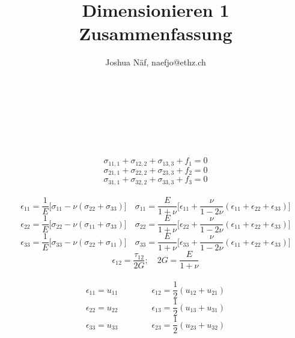 \documentclass[a4paper,10pt]{article}
\title{Dimensionieren 1 Zusammenfassung\vspace{-2ex}}
\author{Joshua Näf, naefjo@ethz.ch}
\date{}
\begin{document}
\newcommand{\mysec}[1]{\colorbox{mydblue}{\textcolor{white}{\parbox{\linewidth-2.4mm}{\scshape{\Large\textbf{#1}} }}}}
\newcommand{\mysubsec}[1]{\colorbox{mylblue}{\textcolor{white}{\\\scshape{\normalsize\textbf{#1}}}}\\}
\newcommand{\mysubsubsec}[1]{\colorbox{mygblue}{\textcolor{white}{\scshape{\footnotesize\textbf{#1}}}}\\}

\begin{multicols*}{3}

\mysec{Methoden d Strukturanalyse}
   \mysubsec{Gleichungen des kontinuums:}
        \mysubsubsec{GGWB des Kontinuums:}
            \[\sigma_{11,1} + \sigma_{12,2} + \sigma_{13,3} + f_1 = 0\]
            \[\sigma_{21,1} + \sigma_{22,2} + \sigma_{23,3} + f_2 = 0\]
            \[\sigma_{31,1} + \sigma_{32,2} + \sigma_{33,3} + f_3 = 0\]
        \mysubsubsec{Stoffgleichungen (SG):}
            \small\[\epsilon_{11} = \frac{1}{E}\lbrack\sigma_{11} - \nu(\sigma_{22} + \sigma_{33})\rbrack \quad \sigma_{11}=\frac{E}{1+\nu}\lbrack\epsilon_{11}+\frac{\nu}{1-2\nu}(\epsilon_{11}+\epsilon_{22}+\epsilon_{33})\rbrack\]
            \[\epsilon_{22} = \frac{1}{E}\lbrack\sigma_{22} - \nu(\sigma_{11} + \sigma_{33})\rbrack \quad \sigma_{22}=\frac{E}{1+\nu}\lbrack\epsilon_{22}+\frac{\nu}{1-2\nu}(\epsilon_{11}+\epsilon_{22}+\epsilon_{33})\rbrack\]
            \[\epsilon_{33} = \frac{1}{E}\lbrack\sigma_{33} - \nu(\sigma_{22} + \sigma_{11})\rbrack \quad \sigma_{33}=\frac{E}{1+\nu}\lbrack\epsilon_{33}+\frac{\nu}{1-2\nu}(\epsilon_{11}+\epsilon_{22}+\epsilon_{33})\rbrack\]\normalsize
            \[\epsilon_{12}=\frac{\tau_{12}}{2G}; \quad 2G=\frac{E}{1+\nu}\]
        \mysubsubsec{Kinematische Randbedingungen (KR):}
            \[\epsilon_{11} = u_{11}\quad\quad\quad\quad\epsilon_{12} = \frac{1}{2}(u_{12} + u_{21})\]
            \[\epsilon_{22} = u_{22}\quad\quad\quad\quad\epsilon_{13} = \frac{1}{2}(u_{13} + u_{31})\]
            \[\epsilon_{33} = u_{33}\quad\quad\quad\quad\epsilon_{23} = \frac{1}{2}(u_{23} + u_{32})\]
        

\end{multicols*}
\end{document}
